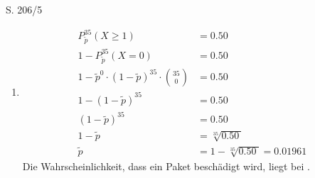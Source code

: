 \begin{Exercise}{S. 206/5}{}
\begin{enumerate}[leftmargin=*]
    \item [5.]{
        \begin{align*}
            P_{\tilde{p}}^{35} \left(X \geq 1\right) &= \SI{0.50}{}\\[1.5ex]
            1 - P_{\tilde{p}}^{35} \left(X = 0\right) &= \SI{0.50}{}\\[1.5ex]
            1 - \tilde{p}^{0} \cdot \left(1 - \tilde{p}\right)^{35} \cdot \binom{35}{0} &= \SI{0.50}{}\\[1.5ex]
            1 -\left(1 - \tilde{p}\right)^{35} &= \SI{0.50}{}\\[1.5ex]
            \left(1 - \tilde{p}\right)^{35} &= \SI{0.50}{}\\[1.5ex]
            1 - \tilde{p} &= \sqrt[35]{\SI{0.50}{}}\\[1.5ex]
            \tilde{p} &= 1 - \sqrt[35]{\SI{0.50}{}} = \SI{0.01961}{}
        \end{align*}
        Die Wahrscheinlichkeit, dass ein Paket beschädigt wird, liegt bei .
    }
\end{enumerate}
\end{Exercise}
\pagebreak

